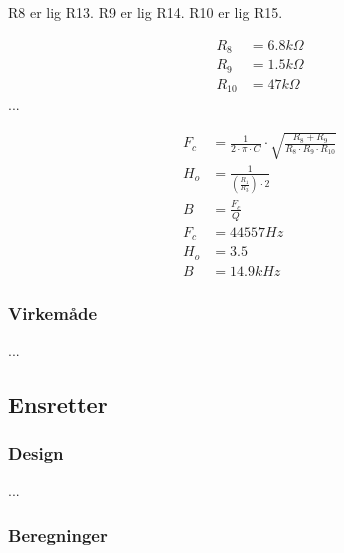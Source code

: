 R8 er lig R13. R9 er lig R14. R10 er lig R15.

\begin{align}
R_8 & = 6.8k \Omega \\
R_9 & = 1.5k \Omega \\
R_{10} & = 47k \Omega
\end{align}
...

\begin{align}
F_c & = \frac{1}{2 \cdot \pi \cdot C} \cdot \sqrt{\frac{R_8+R_9}{R_8 \cdot R_9 \cdot R_{10}}} \\
H_o & = \frac{1}{\left( \frac{R_1}{R_3} \right) \cdot 2} \\
B & = \frac{F_c}{Q} \\
F_c & = 44557Hz \\
H_o & = 3.5 \\
B & = 14.9kHz
\end{align}

\subsubsection{Virkemåde}
...

\subsection{Ensretter}

\subsubsection{Design}
...
\subsubsection{Beregninger}

